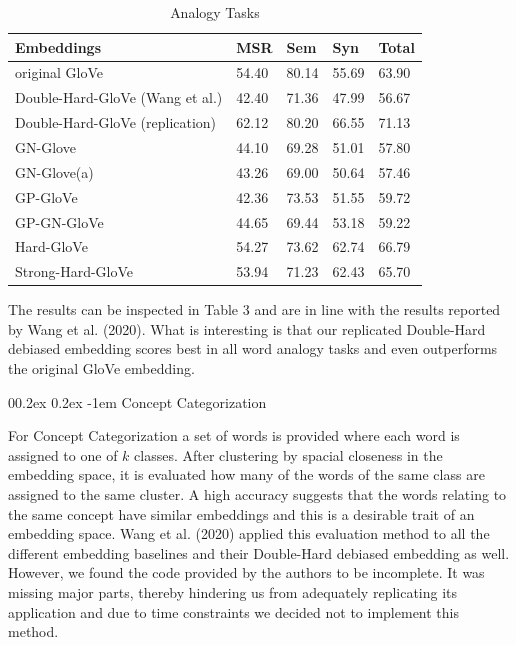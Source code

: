 \documentclass[
  english,
  man,floatsintext]{apa6}
\makeatletter
\let\oldparagraph\paragraph
\renewcommand{\paragraph}[1]{\oldparagraph{#1}\mbox{}}
\renewcommand{\paragraph}{\@startsection{paragraph}{4}{\parindent}%
  {0\baselineskip \@plus 0.2ex \@minus 0.2ex}%
  {-1em}%
  {\normalfont\normalsize\bfseries\itshape\typesectitle}}
\makeatother
\begin{document}
\begin{table}[tbp]

\begin{center}
\begin{threeparttable}

\caption{\label{tab:table 3}Analogy Tasks}

\begin{tabular}{lllll}
\toprule
Embeddings & MSR & Sem & Syn & Total\\
\midrule
original GloVe & 54.40 & 80.14 & 55.69 & 63.90\\
Double-Hard-GloVe (Wang et al.) & 42.40 & 71.36 & 47.99 & 56.67\\
Double-Hard-GloVe (replication) & 62.12 & 80.20 & 66.55 & 71.13\\
GN-Glove & 44.10 & 69.28 & 51.01 & 57.80\\
GN-Glove(a) & 43.26 & 69.00 & 50.64 & 57.46\\
GP-GloVe & 42.36 & 73.53 & 51.55 & 59.72\\
GP-GN-GloVe & 44.65 & 69.44 & 53.18 & 59.22\\
Hard-GloVe & 54.27 & 73.62 & 62.74 & 66.79\\
Strong-Hard-GloVe & 53.94 & 71.23 & 62.43 & 65.70\\
\bottomrule
\end{tabular}

\end{threeparttable}
\end{center}

\end{table}

The results can be inspected in Table 3 and are in line with the results reported by Wang et al. (2020). What is interesting is that our replicated Double-Hard debiased embedding scores best in all word analogy tasks and even outperforms the original GloVe embedding.

\hypertarget{concept-categorization}{%
\paragraph{Concept Categorization}\label{concept-categorization}}

For Concept Categorization a set of words is provided where each word is assigned to one of \(k\) classes. After clustering by spacial closeness in the embedding space, it is evaluated how many of the words of the same class are assigned to the same cluster. A high accuracy suggests that the words relating to the same concept have similar embeddings and this is a desirable trait of an embedding space.
Wang et al. (2020) applied this evaluation method to all the different embedding baselines and their Double-Hard debiased embedding as well. However, we found the code provided by the authors to be incomplete. It was missing major parts, thereby hindering us from adequately replicating its application and due to time constraints we decided not to implement this method.
\end{document}
